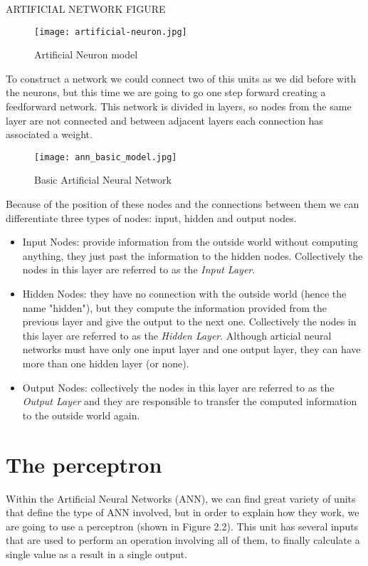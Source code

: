 ARTIFICIAL NETWORK FIGURE

\begin{figure}[ht]
	\centering
	\texttt{[image: artificial-neuron.jpg]}
	\caption{Artificial Neuron model}
	\label{fig:art_neuron}
\end{figure}

To construct a network we could connect two of this units as we did before with the neurons, but this time we are going to go one step forward creating a feedforward network. This network is divided in layers, so nodes from the same layer are not connected and between adjacent layers each connection has associated a weight. 

\begin{figure}[ht]
	\centering
	\texttt{[image: ann\_basic\_model.jpg]}
	\caption{Basic Artificial Neural Network}
\end{figure}

Because of the position of these nodes and the connections between them we can differentiate three types of nodes: input, hidden and output nodes.

\begin{itemize}
	\item Input Nodes: provide information from the outside world without computing anything, they just past the information to the hidden nodes. Collectively the nodes in this layer are referred to as the \textit{Input Layer}. 
	\item Hidden Nodes: they have no connection with the outside world (hence the name "hidden"), but they compute the information provided from the previous layer and give the output to the next one. Collectively the nodes in this layer are referred to as the \textit{Hidden Layer}. Although articial neural networks must have only one input layer and one output layer, they can have more than one hidden layer (or none). 
	\item Output Nodes: collectively the nodes in this layer are referred to as the \textit{Output Layer} and they are responsible to transfer the computed information to the outside world again.
\end{itemize}


\section{The perceptron}
Within the Artificial Neural Networks (ANN), we can find great variety of units that define the type of ANN involved, but in order to explain how they work, we are going to use a perceptron (shown in Figure 2.2). This unit has several inputs that are used to perform an operation involving all of them, to finally calculate a single value as a result in a single output.

